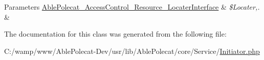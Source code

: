 \begin{DoxyParams}[1]{Parameters}
\hyperlink{interface_able_polecat___access_control___resource___locater_interface}{Able\+Polecat\+\_\+\+Access\+Control\+\_\+\+Resource\+\_\+\+Locater\+Interface} & {\em \$\+Locater,.} & \\
\hline
\end{DoxyParams}


The documentation for this class was generated from the following file\+:\begin{DoxyCompactItemize}
\item 
C\+:/wamp/www/\+Able\+Polecat-\/\+Dev/usr/lib/\+Able\+Polecat/core/\+Service/\hyperlink{_initiator_8php}{Initiator.\+php}\end{DoxyCompactItemize}
